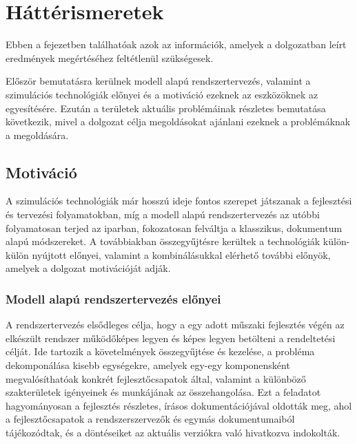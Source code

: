 \chapter{Háttérismeretek}
Ebben a fejezetben találhatóak azok az információk, amelyek a dolgozatban leírt eredmények megértéséhez feltétlenül szükségesek.

Először bemutatásra kerülnek modell alapú rendszertervezés, valamint a szimulációs technológiák előnyei és a motiváció ezeknek az eszközöknek az egyesítésére.
Ezután a területek aktuális problémáinak részletes bemutatása következik, mivel a dolgozat célja megoldásokat ajánlani ezeknek a problémáknak a megoldására.

\section{Motiváció}
    A szimulációs technológiák már hosszú ideje fontos szerepet játszanak a fejlesztési és tervezési folyamatokban, míg a modell alapú rendszertervezés az utóbbi folyamatosan terjed az iparban, fokozatosan felváltja a klasszikus, dokumentum alapú módszereket.
    A továbbiakban összegyűjtésre kerültek a technológiák külön-külön nyújtott előnyei, valamint a kombinálásukkal elérhető további előnyök, amelyek a dolgozat motivációját adják.
    
    \subsection{Modell alapú rendszertervezés előnyei}
        A rendszertervezés elsődleges célja, hogy a egy adott műszaki fejlesztés végén az elkészült rendszer működőképes legyen és képes legyen betölteni a rendeltetési célját.
        Ide tartozik a követelmények összegyűjtése és kezelése, a probléma dekomponálása kisebb egységekre, amelyek egy-egy komponensként megvalósíthatóak konkrét fejlesztőcsapatok által, valamint a különböző szakterületek igényeinek és munkájának az összehangolása.
        Ezt a feladatot hagyományosan a fejlesztés részletes, írásos dokumentációjával oldották meg, ahol a fejlesztőcsapatok a rendszerszervezők és egymás dokumentumaiból tájékozódtak, és a döntéseiket az aktuális verziókra való hivatkozva indokolták.

